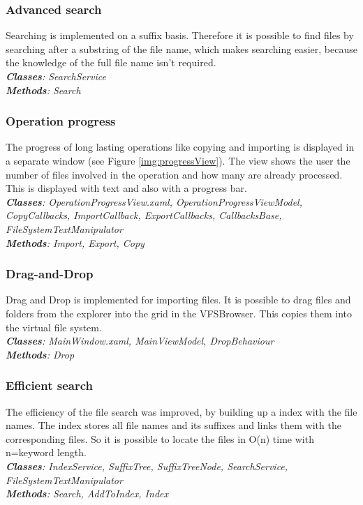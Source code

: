 \documentclass[JCDReport.tex]{subfiles}
\begin{document}
\subsubsection{Advanced search}
Searching is implemented on a suffix basis. Therefore it is possible to find files by searching after a substring of the file name, which makes searching easier, because the knowledge of the full file name isn't required.\\
\textit{\textbf{Classes}: SearchService \\
\textbf{Methods}: Search}

\subsubsection{Operation progress}
The progress of long lasting operations like copying and importing is displayed in a separate window (see Figure \ref{img:progressView}). The view shows the user the number of files involved in the operation and how many are already processed. This is displayed with text and also with a progress bar.\\
\textit{\textbf{Classes}: OperationProgressView.xaml, OperationProgressViewModel, CopyCallbacks, ImportCallback, ExportCallbacks, CallbacksBase, FileSystemTextManipulator\\
\textbf{Methods}: Import, Export, Copy}


\subsubsection{Drag-and-Drop}
Drag and Drop is implemented for importing files. It is possible to drag files and folders from the explorer into the grid in the VFSBrowser. This copies them into the virtual file system.\\
\textit{\textbf{Classes}: MainWindow.xaml, MainViewModel, DropBehaviour \\
\textbf{Methods}: Drop}

\subsubsection{Efficient search}
The efficiency of the file search was improved, by building up a index with the file names. The index stores all file names and its suffixes and links them with the corresponding files. So it is possible to locate the files in O(n) time with n=keyword length.\\
\textit{\textbf{Classes}: IndexService, SuffixTree, SuffixTreeNode, SearchService, FileSystemTextManipulator\\
\textbf{Methods}: Search, AddToIndex, Index}
\end{document}
